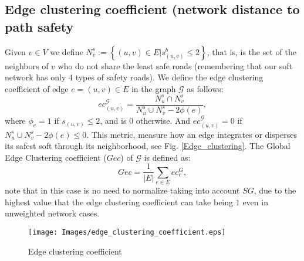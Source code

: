 \documentclass[letterpaper, 10 pt, conference]{ieeeconf}  %
\begin{document}
\subsection{Edge clustering coefficient (network distance to path safety }
Given $v \in V$ we define $N_{v}^{s}:= \left \{(u,v) \in E | s_{(u,v)}^{b} \leq 2 \right\}$, that is, is the set of the neighbors of $v$ who do not share the least safe roads (remembering that our soft network has only 4 types of safety roads). We define the edge clustering coefficient of edge $e = (u,v) \in E$ in the graph $\mathcal{G}$ as follows:
\begin{equation}
    ec_{(u,v)}^{\mathcal{G}} = \frac{N_{u}^{s} \cap N_{v}^{s}}{N_{u}^{s} \cup N_{v}^{s} - 2 \phi(e)},
\end{equation}
where $\phi_{e} = 1$ if $s_{(u,v)} \leq 2$, and is $0$ otherwise. And $ec_{(u,v)}^{\mathcal{G}} = 0$ if $N_{u}^{s} \cup N_{v}^{s} - 2 \phi(e) \leq 0$. This metric, measure how an edge integrates or disperses its safest soft through its neighborhood, see Fig. \ref{Edge_clustering}. The Global Edge Clustering coefficient ($Gec$) of $\mathcal{G}$ is defined as:
\begin{equation}
    Gec = \frac{1}{|E|} \sum_{e \in E} ec_{e}^{G},
\end{equation}
note that in this case is no need to normalize taking into account $SG$, due to the highest value that the edge clustering coefficient can take being $1$ even in unweighted network cases.
\begin{figure}
    \centering
    \texttt{[image: Images/edge\_clustering\_coefficient.eps]}
    \caption{Edge clustering coefficient}
    \label{Ecc_academic_example}
\end{figure}
\end{document}
